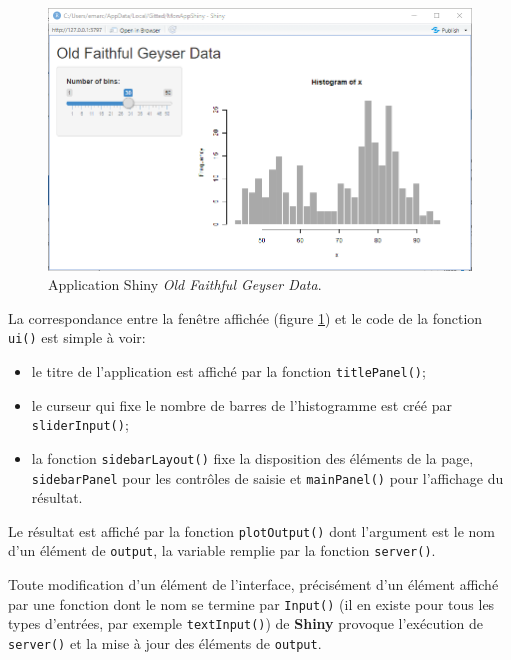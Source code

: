 \documentclass[
  12pt,
  french,
  a4paper,
  extrafontsizes,onecolumn,openright
  ]{memoir}
\providecommand{\tightlist}{%
  \setlength{\itemsep}{0pt}\setlength{\parskip}{0pt}}
\newlength{\rf}
\begin{document}
\scriptsize

\begin{figure}

{\centering \includegraphics[width=0.8\linewidth]{images/shiny-geiser} 

}

\caption{Application Shiny \emph{Old Faithful Geyser Data}.}\label{fig:shiny-geiser}
\end{figure}

\normalsize

La correspondance entre la fenêtre affichée (figure \ref{fig:shiny-geiser}) et le code de la fonction \texttt{ui()} est simple à voir:

\begin{itemize}
\tightlist
\item
  le titre de l'application est affiché par la fonction \texttt{titlePanel()};
\item
  le curseur qui fixe le nombre de barres de l'histogramme est créé par \texttt{sliderInput()};
\item
  la fonction \texttt{sidebarLayout()} fixe la disposition des éléments de la page, \texttt{sidebarPanel} pour les contrôles de saisie et \texttt{mainPanel()} pour l'affichage du résultat.
\end{itemize}

Le résultat est affiché par la fonction \texttt{plotOutput()} dont l'argument est le nom d'un élément de \texttt{output}, la variable remplie par la fonction \texttt{server()}.

Toute modification d'un élément de l'interface, précisément d'un élément affiché par une fonction dont le nom se termine par \texttt{Input()} (il en existe pour tous les types d'entrées, par exemple \texttt{textInput()}) de \textbf{Shiny} provoque l'exécution de \texttt{server()} et la mise à jour des éléments de \texttt{output}.
\end{document}
